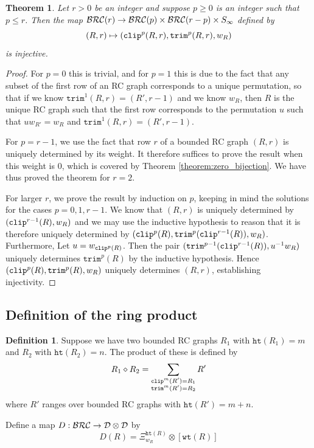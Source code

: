 \documentclass{amsart}
\newtheorem{theorem}{Theorem}[section]
\theoremstyle{definition}
\newtheorem{definition}[lemma]{Definition}
\theoremstyle{remark}
\numberwithin{equation}{subsection}
\newcommand{\wof}[1]{w_{#1}}
\newcommand{\wtt}{\mathtt{wt}}
\newcommand{\trm}{\mathtt{trim}}
\newcommand{\hr}{\mathtt{ht}}
\newcommand{\dsch}{\ensuremath{\Xi}}
\newcommand{\dcoma}{\mathcal{D}}
\begin{document}
\begin{theorem} \label{theorem:howyouslice}
  Let $r>0$ be an integer and suppose $p\geq 0$ is an integer such that $p\leq r$. Then the map $\mathcal{BRC}(r)\to \mathcal{BRC}(p)\times \mathcal{BRC}(r - p)\times S_\infty$ defined by
  $$(R, r)\mapsto (\clp^p(R, r), \trm^{p}(R, r), \wof{R})$$
  is injective.
\end{theorem}
\begin{proof}
For $p = 0$ this is trivial, and for $p = 1$ this is due to the fact that any subset of the first row of an RC graph corresponds to a unique permutation, so that if we know $\trm^1(R, r) = (R', r - 1)$ and we know $\wof{R}$, then $R$ is the unique RC graph such that the first row corresponds to the permutation $u$ such that $u\wof{R'}=\wof{R}$ and $\trm^1(R, r) = (R', r-1)$. 

For $p=r-1$, we use the fact that row $r$ of a bounded RC graph $(R,r)$ is uniquely determined by its weight. It therefore suffices to prove the result when this weight is $0$, which is covered by Theorem \ref{theorem:zero_bijection}. We have thus proved the theorem for $r=2$.

For larger $r$, we prove the result by induction on $p$, keeping in mind the solutions for the cases $p=0,1,r-1$. We know that $(R,r)$ is uniquely determined by $(\clp^{r-1}(R), \wof{R})$ and we may use the inductive hypothesis to reason that it is therefore uniquely determined by $(\clp^{p}(R), \trm^p(\clp^{r-1}(R)), \wof{R})$. Furthermore, Let $u=\wof{\clp^{p}(R)}$. Then the pair $(\trm^{p-1}(\clp^{r-1}(R)), u^{-1}\wof{R})$ uniquely determines $\trm^p(R)$ by the inductive hypothesis. Hence $(\clp^{p}(R), \trm^{p}(R), \wof{R})$ uniquely determines $(R, r)$, establishing injectivity.
\end{proof}

\subsection{Definition of the ring product}

\begin{definition}
Suppose we have two bounded RC graphs $R_1$ with $\hr(R_1)=m$ and $R_2$ with $\hr(R_2)=n$. The product of these is defined by
$$R_1\diamond R_2 = \sum_{\substack{\clp^m(R')=R_1\\\trm^m(R')=R_2}}R'$$  
where $R'$ ranges over bounded RC graphs with $\hr(R')=m+n$.

Define a map $D:\BRC\to \dcoma\otimes \dcoma$ by
$$D(R) = \dsch_{\wof{R}}^{\hr(R)}\otimes [\wtt(R)]$$
\end{definition}
\end{document}
